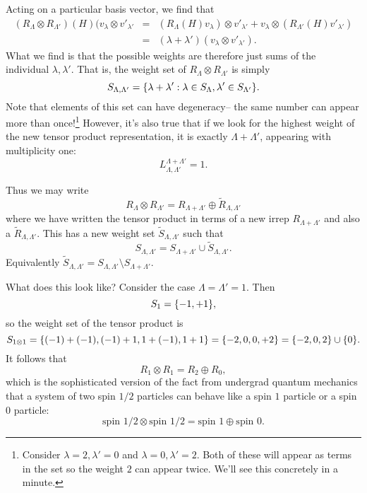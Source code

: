 Acting on a particular basis vector, we find that
\begin{eqnarray*}
(R_\Lambda \otimes R_{\Lambda'})(H)(v_\lambda \otimes v'_{\lambda'}&=&(R_\Lambda(H)v_\lambda) \otimes v'_{\lambda'}+v_\lambda \otimes (R_{\Lambda'}(H)v'_{\lambda'})\\
&=& (\lambda + \lambda')(v_\lambda \otimes v'_{\lambda'}).
\end{eqnarray*}
What we find is that the possible weights are therefore just sums of the individual $\lambda,\lambda'$. That is, the weight set of $R_\Lambda \otimes R_{\Lambda'}$ is simply
$$S_{\Lambda,\Lambda'}=\{\lambda+\lambda': \lambda\in S_{\Lambda},\lambda'\in S_{\Lambda'}\}.$$
Note that elements of this set can have degeneracy-- the same number can appear more than once!\footnote{Consider $\lambda=2,\lambda'=0$ and $\lambda=0,\lambda'=2$. Both of these will appear as terms in the set so the weight $2$ can appear twice. We'll see this concretely in a minute.} However, it's also true that if we look for the highest weight of the new tensor product representation, it is exactly $\Lambda+\Lambda'$, appearing with multiplicity one:
$$L^{\Lambda+\Lambda'}_{\Lambda,\Lambda'}=1.$$

Thus we may write
$$R_\Lambda \otimes R_{\Lambda'}=R_{\Lambda+\Lambda'}\oplus \tilde R_{\Lambda,\Lambda'}$$
where we have written the tensor product in terms of a new irrep $R_{\Lambda+\Lambda'}$ and also a  $\tilde R_{\Lambda,\Lambda'}$. This has a new weight set $\tilde S_{\Lambda, \Lambda'}$ such that
$$S_{\Lambda,\Lambda'}=S_{\Lambda+\Lambda'} \cup \tilde S_{\Lambda,\Lambda'}.$$
Equivalently $\tilde S_{\Lambda,\Lambda'}=S_{\Lambda,\Lambda'}\setminus S_{\Lambda+\Lambda'}.$

What does this look like? Consider the case $\Lambda=\Lambda'=1.$ Then
$$S_1=\{-1,+1\},$$
so the weight set of the tensor product is
$$S_{1\otimes 1}=\{(-1)+(-1),(-1)+1,1+(-1),1+1\}=\{-2,0,0,+2\} =\{-2,0,2\}\cup \{0\}.$$
It follows that
$$R_1\otimes R_1 = R_2 \oplus R_0,$$
which is the sophisticated version of the fact from undergrad quantum mechanics that a system of two spin $1/2$ particles can behave like a spin $1$ particle or a spin $0$ particle:
$$\text{spin }1/2 \otimes \text{spin } 1/2 = \text{spin }1 \oplus \text{spin } 0.$$